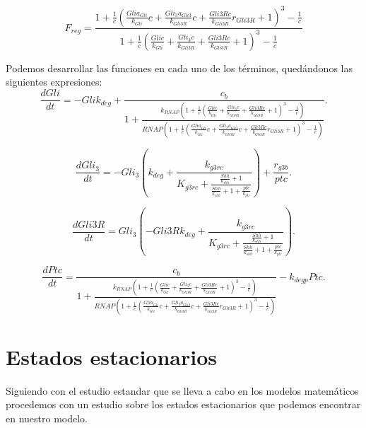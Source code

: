 \begin{equation}
F_{reg}=\frac{1 + \frac{1}{c} \left(\frac{Gli a_{Gli}}{k_{Gli}} c + \frac{Gli_{3} a_{Gli3}}{k_{Gli3R}} c + \frac{Gli3R c}{k_{Gli3R}} r_{Gli3R} + 1\right)^{3} - \frac{1}{c}}{1 + \frac{1}{c} \left(\frac{Gli c}{k_{Gli}} + \frac{Gli_{3} c}{k_{Gli3R}} + \frac{Gli3R c}{k_{Gli3R}} + 1\right)^{3} - \frac{1}{c}}
\end{equation}






Podemos desarrollar las funciones en cada uno de los términos, quedándonos las siguientes expresiones:
\begin{equation}
\frac{dGli}{dt}=- Gli k_{deg} + \frac{c_{b}}{1 + \frac{k_{RNAP} \left(1 + \frac{1}{c} \left(\frac{Gli c}{k_{Gli}} + \frac{Gli_{3} c}{k_{Gli3R}} + \frac{Gli3R c}{k_{Gli3R}} + 1\right)^{3} - \frac{1}{c}\right)}{RNAP \left(1 + \frac{1}{c} \left(\frac{Gli a_{Gli}}{k_{Gli}} c + \frac{Gli_{3} a_{Gli3}}{k_{Gli3R}} c + \frac{Gli3R c}{k_{Gli3R}} r_{Gli3R} + 1\right)^{3} - \frac{1}{c}\right)}}.
\end{equation}


\begin{equation}
\frac{dGli_3}{dt}=- Gli_{3} \left(k_{deg} + \frac{k_{g3rc}}{K_{g3rc} + \frac{\frac{Shh}{k_{shh}} + 1}{\frac{Shh}{k_{shh}} + 1 + \frac{ptc}{k_{ptc}}}}\right) + \frac{r_{g3b}}{ptc}.
\end{equation}

\begin{equation}
\frac{dGli3R}{dt}=Gli_{3} \left(- Gli3R k_{deg} + \frac{k_{g3rc}}{K_{g3rc} + \frac{\frac{Shh}{k_{shh}} + 1}{\frac{Shh}{k_{shh}} + 1 + \frac{ptc}{k_{ptc}}}}\right).
\end{equation}

\begin{equation}
\frac{dPtc}{dt}=\frac{c_{b}}{1 + \frac{k_{RNAP} \left(1 + \frac{1}{c} \left(\frac{Gli c}{k_{Gli}} + \frac{Gli_{3} c}{k_{Gli3R}} + \frac{Gli3R c}{k_{Gli3R}} + 1\right)^{3} - \frac{1}{c}\right)}{RNAP \left(1 + \frac{1}{c} \left(\frac{Gli a_{Gli}}{k_{Gli}} c + \frac{Gli_{3} a_{Gli3}}{k_{Gli3R}} c + \frac{Gli3R c}{k_{Gli3R}} r_{Gli3R} + 1\right)^{3} - \frac{1}{c}\right)}} - k_{deg p} Ptc.
\end{equation}




\section{Estados estacionarios}
Siguiendo con el estudio estandar que se lleva a cabo en los modelos matemáticos procedemos con un estudio sobre los estados estacionarios que podemos encontrar en nuestro modelo.

